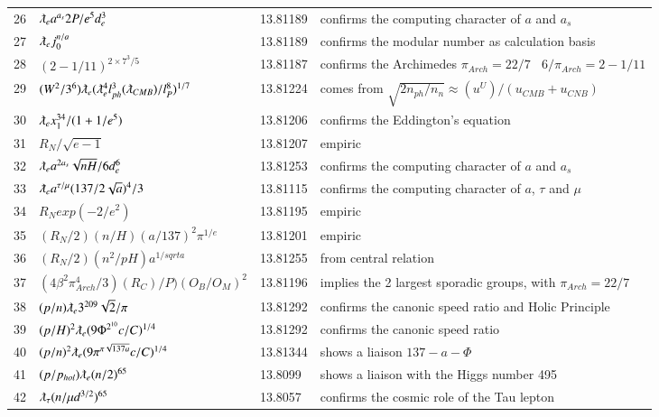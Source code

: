 \documentclass[a4paper,9pt]{article}
\begin{document}
\begin{appendix}
\begin{table}
\begin{tabular}{llll}
   26 & $\lambdabar_{e} a^{a_s} 2P/e^5d_e^3$ & 13.81189 & confirms the computing character of $a$ and $a_s$ \\
   27 & $\lambdabar_{e} j_0^{n/a}$ & 13.81189 & confirms the modular number as calculation basis\\
   28 & $(2-1/11)^{2\times 7^3/5}$ & 13.81187 & confirms the Archimedes $\pi_{Arch} = 22/7~~~~ 6/\pi_{Arch} =2-1/11$\\
   29 & $ (W^2/3^6)\lambdabar_{e} (\lambdabar_{e}^4 l_{ph}^3 (\lambdabar_{CMB})/l_P^8)^{1/7}$ & 13.81224 & comes from $\sqrt{2n_{ph}/n_n} \approx (u^U)/(u_{CMB}+u_{CNB})$\\ 
   30 & $\lambdabar_{e} x_1^{34} /(1+1/e^5)$ & 13.81206 & confirms the Eddington's equation\\
   31 & $R_N /\sqrt {e-1}$ & 13.81207 & empiric\\
   32 & $\lambdabar_{e} a^{2a_s} \sqrt{nH}/6d_e^6 $ & 13.81253 & confirms the computing character of $a$ and $a_s$\\
   33 & $\lambdabar_{e} a^{\tau / \mu} (137/2\sqrt a)^4 /3 $ & 13.81115 & confirms the computing character of $a$, $\tau$ and $\mu$\\
   34 & $R_N exp(-2/e^2)$ & 13.81195 & empiric\\
   35 & $(R_N/2)(n/H)(a/137)^2 \pi^{1/e}$ & 13.81201 & empiric\\ 
   36 & $(R_N/2)(n^2/pH)a^{1/sqrt a}$ & 13.81255 & from central relation\\
   37 & $(4\beta^2 \pi_{Arch}^4 /3) (R_C)/P) (O_B/O_M)^2$ & 13.81196 & implies the 2 largest sporadic groups, with $\pi_{Arch} =
  22/7$\\  
   38 & $(p/n) \lambdabar_{e} 3^{209} \sqrt2/\pi$ & 13.81292 & confirms the canonic speed ratio and Holic Principle\\   
   39 & $(p/H)^2 \lambdabar_{e} (9\Phi^{2^{10}}c/C)^{1/4}$ & 13.81292 & confirms the canonic speed ratio\\   
   40 & $(p/n)^2 \lambdabar_{e} (9\pi^{\pi \sqrt{137a}}c/C)^{1/4}$ & 13.81344 & shows a liaison $137-a-\Phi$\\  
   41 & $(p/p_{hol}) \lambdabar_{e} (n/2)^{65}$ & 13.8099 & shows a liaison with the Higgs number 495\\  
   42 & $ \lambdabar_{\tau} (n/\mu d^{3/2})^{65} $ & 13.8057 & confirms the cosmic role of the Tau lepton \\

\end{tabular}
\end{table}
\end{appendix}
\end{document}
